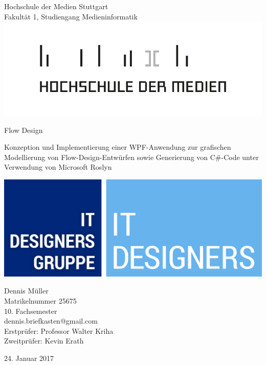 \thispagestyle{empty}

\begin{center}
	

\large{Hochschule der Medien Stuttgart\\
Fakultät 1, Studiengang Medieninformatik}\\
\vspace{1cm}
\includegraphics[width=0.4\linewidth]{img/HdM-Logo.png}
\vspace{1.5cm}

\huge{Flow Design}

\large{Konzeption und Implementierung einer WPF-Anwendung zur grafischen
Modellierung von Flow-Design-Entwürfen sowie Generierung von
C\#-Code unter Verwendung von Microsoft Roslyn}

\vspace{1cm}

\vspace{1cm}
\includegraphics[scale=0.07]{img/IT_DESIGNERS.jpg}
\vspace{1.5cm}

\large{
	Dennis Müller \\
	Matrikelnummer 25675\\
	10. Fachsemester\\
	dennis.briefkasten@gmail.com \\ 
}
\vspace{1cm}
\large{	
	Erstprüfer: Professor Walter Kriha \\	
	Zweitprüfer: Kevin Erath
	}

\vspace{1cm}
{24. Januar 2017}


\end{center}

